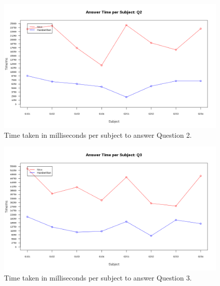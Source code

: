 \documentclass[12pt,twoside,notitlepage,xetex]{report}
\begin{document}
\begin{center}
\begin{figure}[H]
\begin{center}
\includegraphics[width=\textwidth-2cm]{figs/graphs/q2.png}
\end{center}
\caption{Time taken in milliseconds per subject to answer Question 2.}
\end{figure}
\end{center}

\begin{center}
\begin{figure}[H]
\begin{center}
\includegraphics[width=\textwidth-2cm]{figs/graphs/q3.png}
\end{center}
\caption{Time taken in milliseconds per subject to answer Question 3.}
\end{figure}
\end{center}
\end{document}
